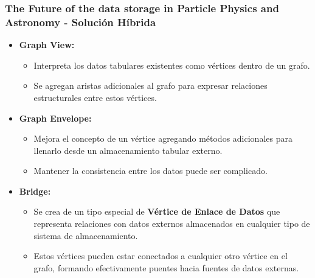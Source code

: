 \begin{frame}
    \frametitle{The Future of the data storage in Particle Physics and Astronomy - Solución Híbrida}

    \begin{itemize}
        \item \textbf{Graph View:}

        \begin{itemize}
            \item Interpreta los datos tabulares existentes como vértices dentro de un grafo.

             
            
            \item Se agregan aristas adicionales al grafo para expresar relaciones estructurales entre estos vértices.
        \end{itemize}

         
    
        \item \textbf{Graph Envelope:}
        
        \begin{itemize}
            \item Mejora el concepto de un vértice agregando métodos adicionales para llenarlo desde un almacenamiento tabular externo.

             
            
            \item Mantener la consistencia entre los datos puede ser complicado.
        \end{itemize}

         

        \item \textbf{Bridge:} 
        
        \begin{itemize}
            \item Se crea de un tipo especial de \textbf{Vértice de Enlace de Datos} que representa relaciones con datos externos almacenados en cualquier tipo de sistema de almacenamiento.

             
                
            \item Estos vértices pueden estar conectados a cualquier otro vértice en el grafo, formando efectivamente puentes hacia fuentes de datos externas.
        \end{itemize}
    \end{itemize}

\end{frame}

